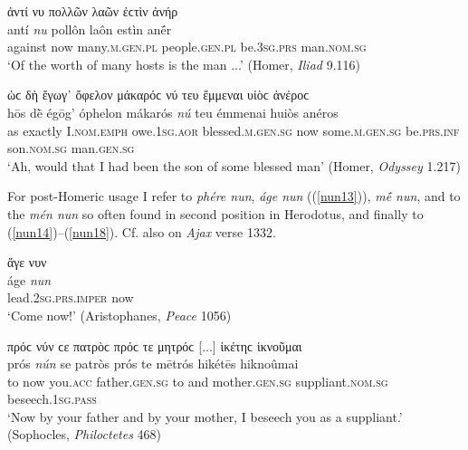 \begin{exe}
\ex ἀντί νυ πολλῶν λαῶν ἐϲτὶν ἀνήρ\\
\gll antí \emph{nu} pollôn laôn estìn anḗr\\
against now many.\textsc{m.gen.pl} people.\textsc{gen.pl} be.\textsc{3sg.prs} man.\textsc{nom.sg}\\
\trans `Of the worth of many hosts is the man ...' (Homer, \textit{Iliad} 9.116)
\label{nun11}
\end{exe}

\begin{exe}
\ex ὡϲ δὴ ἔγωγ᾽ ὄφελον μάκαρόϲ νύ τευ ἔμμεναι υἱὸϲ ἀνέροϲ\\
\gll hōs dḕ égōg' óphelon mákarós \emph{nú} teu émmenai huiòs anéros\\
as exactly I.\textsc{nom.emph} owe.\textsc{1sg.aor} blessed.\textsc{m.gen.sg} now some.\textsc{m.gen.sg} be.\textsc{prs.inf} son.\textsc{nom.sg} man.\textsc{gen.sg}\\
\trans `Ah, would that I had been the son of some blessed man' (Homer, \textit{Odyssey} 1.217)
\label{nun12}
\end{exe}

For post-Homeric usage I refer to \textit{phére nun}, \textit{áge nun} ((\ref{nun13})), \textit{mḗ nun}, and to the \textit{mén nun} so often found in second position in Herodotus, and finally to (\ref{nun14})--(\ref{nun18}). Cf. also \citet[475]{Lobeck1835} on \textit{Ajax} verse 1332.

\begin{exe}
\ex ἄγε νυν\\
\gll áge \emph{nun}\\
lead.\textsc{2sg.prs.imper} now\\
\trans `Come now!' (Aristophanes, \textit{Peace} 1056)
\label{nun13}
\end{exe}

\begin{exe}
\ex πρόϲ νύν ϲε πατρὸϲ πρόϲ τε μητρόϲ {[}...{]} ἱκέτηϲ ἱκνοῦμαι\\
\gll prós \emph{nún} se patròs prós te mētrós hikétēs hiknoûmai\\
to now you.\textsc{acc} father.\textsc{gen.sg} to and mother.\textsc{gen.sg} suppliant.\textsc{nom.sg} beseech.\textsc{1sg.pass}\\
\trans `Now by your father and by your mother, I beseech you as a suppliant.' (Sophocles, \textit{Philoctetes} 468)
\label{nun14}
\end{exe}

